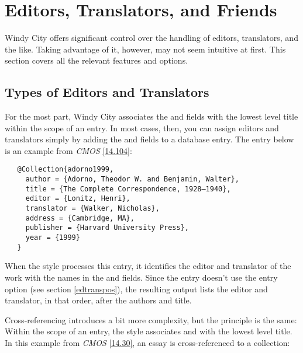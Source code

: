 \documentclass[11pt,letterpaper,oneside]{article}
\begin{document}
\section{Editors, Translators, and Friends}
\label{edtrans}

Windy City offers significant control over the handling of editors,
translators, and the like. Taking advantage of it, however, may not
seem intuitive at first. This section covers all the relevant features
and options.

\subsection{Types of Editors and Translators}
\label{edtransnames}

For the most part, Windy City associates the  and
 fields with the lowest level title within the
scope of an entry. In most cases, then, you can assign editors and
translators simply by adding the  and
 fields to a database entry. The entry below is
an example from \textit{CMOS} \ref{14.104}:

\begin{verbatim}
   @Collection{adorno1999,
     author = {Adorno, Theodor W. and Benjamin, Walter},
     title = {The Complete Correspondence, 1928–1940},
     editor = {Lonitz, Henri},
     translator = {Walker, Nicholas},
     address = {Cambridge, MA},
     publisher = {Harvard University Press},
     year = {1999}
   }
\end{verbatim}

\begin{citebib}
\item \cite{adorno1999}
\end{citebib}

\noindent When the style processes this entry, it identifies the
editor and translator of the work with the names in the
 and  fields. Since the entry
doesn't use the  entry option (see section
\ref{edtranspos}), the resulting output lists the editor and
translator, in that order, after the authors and title.

Cross-referencing introduces a bit more complexity, but the principle
is the same: Within the scope of an entry, the style associates
 and  with the lowest level
title. In this example from \textit{CMOS} \ref{14.30}, an essay is
cross-referenced to a collection:
\end{document}
